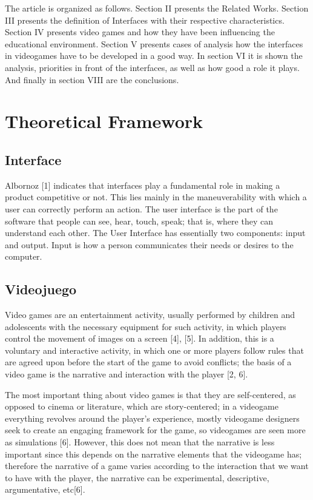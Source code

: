 \documentclass[conference, letterpaper]{IEEEtran}
\begin{document}
The article is organized as follows. Section II presents the Related Works. Section III presents the definition of Interfaces with their respective characteristics. Section IV presents video games and how they have been influencing the educational environment. Section V presents cases of analysis how the interfaces in videogames have to be developed in a good way. In section VI it is shown the analysis, priorities in front of the interfaces, as well as how good a role it plays. And finally in section VIII are the conclusions.
\section{Theoretical Framework}
\subsection{Interface}
Albornoz [1] indicates that interfaces play a fundamental role in making a product competitive or not. This lies mainly in the maneuverability with which a user can correctly perform an action. The user interface is the part of the software that people can see, hear, touch, speak; that is, where they can understand each other. The User Interface has essentially two components: input and output. Input is how a person communicates their needs or desires to the computer.

\subsection{Videojuego}
Video games are an entertainment activity, usually performed by children and adolescents with the necessary equipment for such activity, in which players control the movement of images on a screen [4], [5]. In addition, this is a voluntary and interactive activity, in which one or more players follow rules that are agreed upon before the start of the game to avoid conflicts; the basis of a video game is the narrative and interaction with the player [2, 6].

The most important thing about video games is that they are self-centered, as opposed to cinema or literature, which are story-centered; in a videogame everything revolves around the player's experience, mostly videogame designers seek to create an engaging framework for the game, so videogames are seen more as simulations [6].  However, this does not mean that the narrative is less important since this depends on the narrative elements that the videogame has; therefore the narrative of a game varies according to the interaction that we want to have with the player, the narrative can be experimental, descriptive, argumentative, etc[6].
\end{document}
